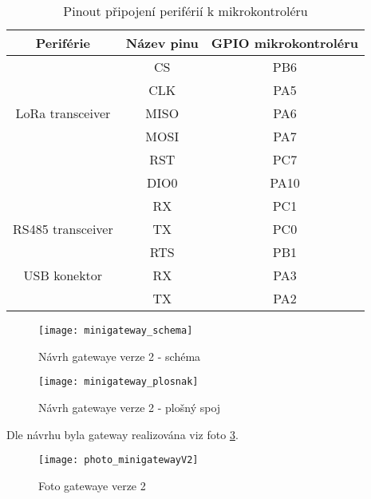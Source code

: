 \newpage
\begin{longtable}{ |c|c|c| }

    \caption{Pinout připojení periférií k mikrokontroléru}
    \label{table:Pinout připojení periférií k mikrokontroléru v2} \\
\hline

Periférie          & Název pinu & GPIO mikrokontroléru           \\ \hline \hline

            & CS    &  PB6             \\
            & CLK   &  PA5        \\
LoRa transceiver    & MISO  &  PA6     \\
            & MOSI  &  PA7        \\
            & RST   & PC7          \\
            & DIO0  & PA10         \\
            \hline

            & RX  &   PC1            \\
RS485 transceiver   & TX  &   PC0       \\
            & RTS  &  PB1      \\     \hline

USB konektor        & RX    & PA3    \\
            & TX    & PA2   \\          \hline
\end{longtable}


\begin{figure}[!h]
    \centering
    \texttt{[image: minigateway\_schema]}
    \caption{Návrh gatewaye verze 2 - schéma}
    \label{fig:minigateway_schema}
\end{figure}

\begin{figure}[!h]
    \centering
    \texttt{[image: minigateway\_plosnak]}
    \caption{Návrh gatewaye verze 2 - plošný spoj}
    \label{fig:minigateway_plosnak}
\end{figure}


Dle návrhu byla gateway realizována viz foto \ref{fig:minigateway_fotoV2}.

\begin{figure}[!h]
    \centering
    \texttt{[image: photo\_minigatewayV2]}
    \caption{Foto gatewaye verze 2}
    \label{fig:minigateway_fotoV2}
\end{figure}



